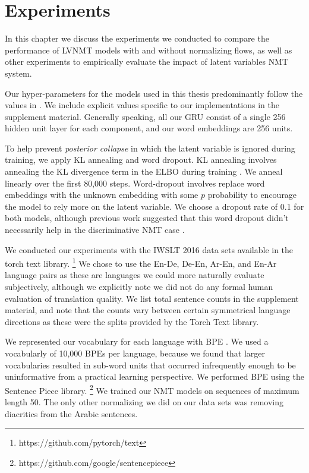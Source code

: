 \chapter{Experiments}

In this chapter we discuss the experiments we conducted to compare the performance of \ac{LVNMT} models with and without normalizing flows, as well as other experiments to empirically evaluate the impact of latent variables \ac{NMT} system.  

Our hyper-parameters for the models used in this thesis predominantly follow the values in \cite{eikema2018AEVNMT}. We include explicit values specific to our implementations in the supplement material. Generally speaking, all our \ac{GRU} consist of a single 256 hidden unit layer for each component, and our word embeddings are 256 units.

To help prevent \textit{posterior collapse} in which the latent variable is ignored during training, we apply KL annealing and word dropout. KL annealing involves annealing the KL divergence term in the \ac{ELBO} during training \cite{bowman2015GeneratingSent}. We anneal  linearly over the first 80,000 steps. Word-dropout involves replace word embeddings with the unknown embedding with some $p$ probability to encourage the model to rely more on the latent variable. We choose a dropout rate of 0.1 for both models, although previous work suggested that this word dropout didn't necessarily help in the discriminative \ac{NMT} case \cite{harshil2018GNMT}. 

We conducted our experiments with the IWSLT 2016 data sets available in the torch text library. \footnote{https://github.com/pytorch/text} We chose to use the En-De, De-En, Ar-En, and En-Ar language pairs as these are languages we could more naturally evaluate subjectively, although we explicitly note we did not do any formal human evaluation of translation quality. We list total sentence counts in the supplement material, and note that the counts vary between certain symmetrical language directions as these were the splits provided by the Torch Text library. 

We represented our vocabulary for each language with \ac{BPE} \cite{sennrich2015NMTRarwordsBPE}. We used a vocabularly of 10,000 \ac{BPE}s per language, because we found that larger vocabularies resulted in sub-word units that occurred infrequently enough to be uninformative from a practical learning perspective. We performed \ac{BPE} using the Sentence Piece library. \footnote{https://github.com/google/sentencepiece} We trained our \ac{NMT} models on sequences of maximum length 50. The only other normalizing we did on our data sets was removing diacritics from the Arabic sentences. 


